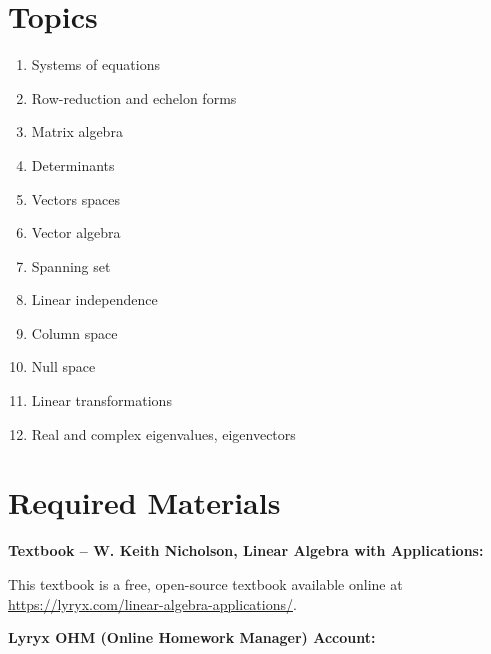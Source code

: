 \documentclass{article}
\begin{document}
	\section*{Topics}
	\begin{enumerate}
		\item Systems of equations

		\item Row-reduction and echelon forms

		\item Matrix algebra

		\item Determinants

		\item Vectors spaces

		\item Vector algebra

		\item Spanning set

		\item Linear independence

		\item Column space

		\item Null space

		\item Linear transformations

		\item Real and complex eigenvalues, eigenvectors
	\end{enumerate}

	\section*{Required Materials}
	\textbf{Textbook -- W. Keith Nicholson, Linear Algebra with Applications:}

	\noindent
	This textbook is a free, open-source textbook available online at 
    \url{https://lyryx.com/linear-algebra-applications/}.

	\noindent
	\textbf{Lyryx OHM (Online Homework Manager) Account:}
\end{document}
